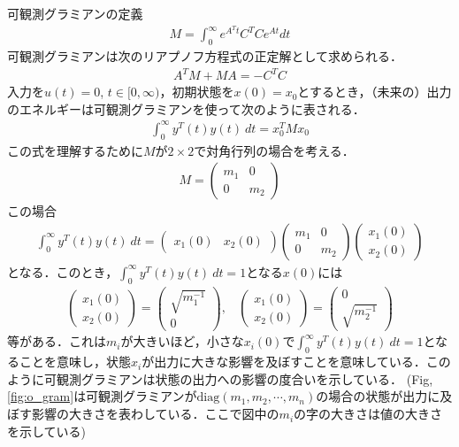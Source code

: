 \noindent
可観測グラミアンの定義
\begin{align}
	M = \int_{0}^{\infty} e^{A^T t} C^T C e^{At} dt
\end{align}
可観測グラミアンは次のリアプノフ方程式の正定解として求められる．
\begin{align}
	A^T M + M A = - C^T C
\end{align}
入力を$u(t)=0$, $t \in [0, \infty)$，初期状態を$x(0)=x_0$とするとき，（未来の）出力のエネルギーは可観測グラミアンを使って次のように表される．
\begin{align}
	\int_{0}^{\infty} y^T(t) y(t) \ dt = x_0^T M x_0
\end{align}
この式を理解するために$M$が$2 \times 2$で対角行列の場合を考える．
\begin{align}
	M = 
	\left(\begin{array}{cc}
         m_1 & 0 \\
	 0   & m_2 
	\end{array}\right)
\end{align}
この場合
\begin{align}
	\int_{0}^{\infty} y^T(t) y(t) \ dt 
	=
	\left(\begin{array}{cc}
         x_1(0) & x_2(0) 
	\end{array}\right)
	\left(\begin{array}{cc}
         m_1 & 0 \\
	 0   & m_2 
	\end{array}\right)
	\left(\begin{array}{c}
         x_1(0)\\
	 x_2(0) 
	\end{array}\right)
\end{align}
となる．このとき，$\int_{0}^{\infty} y^T(t) y(t) \ dt =1$となる$x(0)$には
\begin{align}
	\left(\begin{array}{c}
         x_1(0)\\
	 x_2(0) 
	\end{array}\right)
	= 
	\left(\begin{array}{c}
         \sqrt{m_1^{-1}}\\
	 0 
	\end{array}\right)
	, \ \ \ \ 
	\left(\begin{array}{c}
         x_1(0)\\
	 x_2(0) 
	\end{array}\right)
	= 
	\left(\begin{array}{c}
         0\\
	 \sqrt{m_2^{-1}} 
	\end{array}\right)
\end{align}
等がある．これは$m_i$が大きいほど，小さな$x_i(0)$で$\int_{0}^{\infty} y^T(t) y(t) \ dt =1$となることを意味し，状態$x_i$が出力に大きな影響を及ぼすことを意味している．このように可観測グラミアンは状態の出力への影響の度合いを示している．
(Fig,\ref{fig:o_gram}は可観測グラミアンが$\mbox{diag}(m_1, m_2, \cdots, m_n)$の場合の状態が出力に及ぼす影響の大きさを表わしている．ここで図中の$m_i$の字の大きさは値の大きさを示している)


